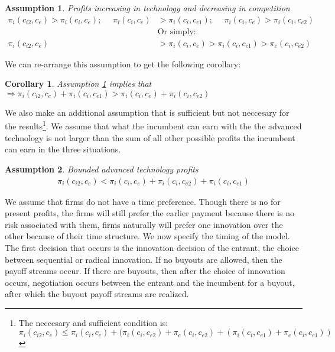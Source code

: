 \documentclass[12pt]{report}
\newtheorem{corollary}[theorem]{Corollary}
\newtheorem{assumption}{Assumption}
\numberwithin{equation}{section}
\begin{document}
\begin{assumption}{Profits increasing in technology and decreasing in competition}\label{as2}
\begin{align*}
\pi_{i}(c_{i2},c_{e})>\pi_{i}(c_{i},c_{e}); ~~~~~~ \pi_{i}(c_{i},c_{e})&> \pi_{i}(c_{i},c_{e1}); ~~~~~~ \pi_{i}(c_{i},c_{e})>\pi_{i}(c_{i},c_{e2}) \\
&\text{Or simply:} \\
\pi_{i}(c_{i2},c_{e})&>\pi_{i}(c_{i},c_{e})>\pi_{i}(c_{i},c_{e1})>\pi_{e}(c_{i},c_{e2})
\end{align*}
\end{assumption} 
We can re-arrange this assumption to get the following corollary: 
\begin{corollary}\label{cor}
Assumption \ref{as2} implies that $\Rightarrow \pi_{i}(c_{i2},c_{e}) + \pi_{i}(c_{i},c_{e1}) > \pi_{i}(c_{i},c_{e}) + \pi_{i}(c_{i},c_{e2}) $ 
\end{corollary}
We also make an additional assumption that is sufficient but not neccesary for the results\footnote{The neccesary and sufficient condition is: $\pi_{i}(c_{i2},c_{e}) \leq \pi_{i}(c_{i},c_{e})+(\pi_{i}(c_{i},c_{e2}) + \pi_{e}(c_{i},c_{e2})+(\pi_{i}(c_{i},c_{e1}) + \pi_{e}(c_{i},c_{e1}))$}. We assume that what the incumbent can earn with the the advanced technology is not larger than the sum of all other possible profits the incumbent can earn in the three situations. 
\begin{assumption}{Bounded advanced technology profits}\label{as3}
\begin{align*}
\pi_{i}(c_{i2},c_{e})<\pi_{i}(c_{i},c_{e})+ \pi_{i}(c_{i},c_{e2})+ \pi_{i}(c_{i},c_{e1})
\end{align*}
\end{assumption} 
We assume that firms do not have a time preference. Though there is no  for present profits, the firms will still prefer the earlier payment because there is no risk associated with them, firms naturally will prefer one innovation over the other because of their time structure. 
We now specify the timing of the model. The first decision that occurs is the innovation decision of the entrant, the choice between sequential or radical innovation. If no buyouts are allowed, then the payoff streams occur. If there are buyouts, then after the choice of innovation occurs, negotiation occurs between the entrant and the incumbent for a buyout, after which the buyout payoff streams are realized.
\end{document}
